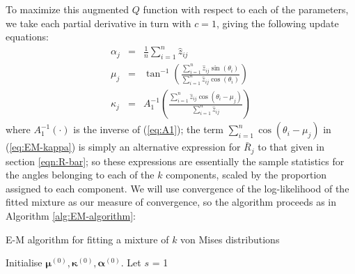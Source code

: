 \documentclass[../../ArchStats.tex]{subfiles}
\begin{document}
To maximize this augmented $Q$ function with respect to each of the parameters, we take each partial derivative in turn with $c=1$, giving the following update equations:
\begin{eqnarray}
\label{eq:EM-alpha}
\alpha_j &=& \frac{1}{n} \sum_{i=1}^n \hat{z}_{ij} \\[5pt]
\label{eq:EM-mu}
\mu_j &=& \tan^{-1} \left( \frac{\sum_{i=1}^n \hat{z}_{ij} \sin(\theta_i)}{\sum_{i=1}^n \hat{z}_{ij} \cos(\theta_i)} \right) \\[5pt]
\label{eq:EM-kappa}
\kappa_j &=& A_1^{-1} \left(\frac{\sum_{i=1}^n \hat{z}_{ij} \cos(\theta_i - \mu_j)}{\sum_{i=1}^n \hat{z}_{ij}}\right)
\end{eqnarray}
where $A_1^{-1}(\cdot)$ is the inverse of (\ref{eq:A1}); the term $\sum_{i=1}^n \cos(\theta_i - \mu_j)$ in (\ref{eq:EM-kappa}) is simply an alternative expression for $\bar{R}_j$ to that given in section \ref{eqn:R-bar}; so these expressions are essentially the sample statistics for the angles belonging to each of the $k$ components, scaled by the proportion assigned to each component. We will use convergence of the log-likelihood of the fitted mixture as our measure of convergence, so the algorithm proceeds as in Algorithm \ref{alg:EM-algorithm}:

\begin{algorithm}[h!]
    \caption{E-M algorithm for fitting a mixture of $k$ von Mises distributions}
	\label{alg:EM-algorithm}



Initialise $\boldsymbol{\mu}^{(0)}, \boldsymbol{\kappa}^{(0)}, \boldsymbol{\alpha}^{(0)}$. Let $s$ = 1\;

\end{algorithm}
\end{document}
